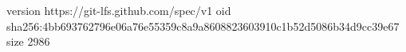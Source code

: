 version https://git-lfs.github.com/spec/v1
oid sha256:4bb693762796e06a76e55359c8a9a8608823603910c1b52d5086b34d9cc39e67
size 2986
